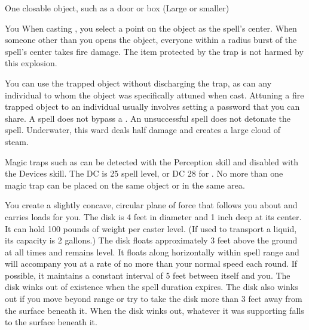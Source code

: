 \begin{spelltarget}{One closable object, such as a door or box (Large or smaller)}
\begin{spelltarget}{You}
\spelleffect When casting , you select a point on the object as the spell's center. When someone other than you opens the object, everyone within a \areasmall radius burst of the spell's center takes fire damage. The item protected by the trap is not harmed by this explosion.
\par You can use the trapped object without discharging the trap, as can any individual to whom the object was specifically attuned when cast. Attuning a fire trapped object to an individual usually involves setting a password that you can share.
\spellnotes A  spell does not bypass a . An unsuccessful  spell does not detonate the spell. Underwater, this ward deals half damage and creates a large cloud of steam.
\par Magic traps such as  can be detected with the Perception skill and disabled with the Devices skill. The DC is 25 \add spell level, or DC 28 for . No more than one magic trap can be placed on the same object or in the same area.

\spelldur{\durext \dismissable}
\spelleffect You create a slightly concave, circular plane of force that follows you about and carries loads for you. The disk is 4 feet in diameter and 1 inch deep at its center. It can hold 100 pounds of weight per caster level. (If used to transport a liquid, its capacity is 2 gallons.) The disk floats approximately 3 feet above the ground at all times and remains level. It floats along horizontally within spell range and will accompany you at a rate of no more than your normal speed each round. If possible, it maintains a constant interval of 5 feet between itself and you. The disk winks out of existence when the spell duration expires. The disk also winks out if you move beyond range or try to take the disk more than 3 feet away from the surface beneath it. When the disk winks out, whatever it was supporting falls to the surface beneath it.


\end{spelltarget}
\end{spelltarget}
